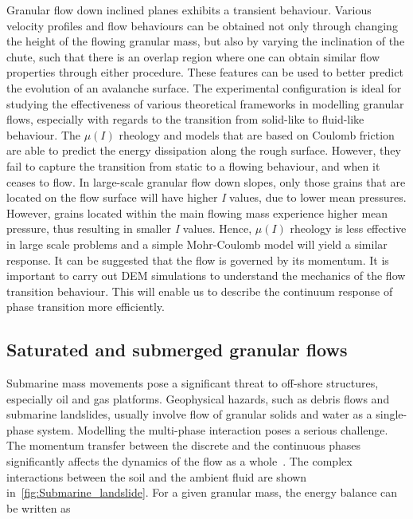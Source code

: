 Granular flow down inclined planes exhibits a transient behaviour. Various 
velocity profiles and flow behaviours can be obtained not only through changing 
the height of the flowing granular mass, but also by varying the inclination of 
the chute, such that there is an overlap region where one can obtain similar 
flow properties through either procedure. These features can be used to better 
predict the evolution of an avalanche surface. The experimental configuration 
is ideal for studying the effectiveness of various theoretical frameworks in 
modelling granular flows, especially with regards to the transition from 
solid-like to fluid-like behaviour. The $\mu(I)$ rheology and models 
that are based on Coulomb friction are able to predict the energy dissipation 
along the rough surface. However, they fail to capture the transition from 
static to a flowing behaviour, and when it ceases to flow. 
In large-scale granular flow down slopes, only those grains that are
located on the flow surface will have higher \textit{I} values, due to lower 
mean pressures. However, grains located within the main flowing mass  
experience higher mean pressure, thus resulting in smaller \textit{I} 
values. Hence, $\mu(I)$ rheology is less effective in large scale problems and 
a simple Mohr-Coulomb model will yield a similar response. It can be 
suggested that the flow is governed by its momentum. It is 
important to carry out DEM simulations to understand the mechanics of the flow 
transition behaviour. This will enable us to describe the continuum response of 
phase transition more efficiently.

\subsection{Saturated and submerged granular flows}
Submarine mass movements pose a significant threat to off-shore structures, 
especially oil and gas platforms. Geophysical hazards, such as debris flows and 
submarine landslides, usually involve flow of granular solids and water as a 
single-phase system. Modelling the multi-phase interaction poses a serious 
challenge. The momentum transfer between the discrete and the continuous phases 
significantly affects the dynamics of the flow as a whole~\citep{Topin2011}. 
The complex interactions between the soil and the ambient fluid are shown 
in~\cref{fig:Submarine_landslide}. For a given granular mass, the energy 
balance can be written as
%

